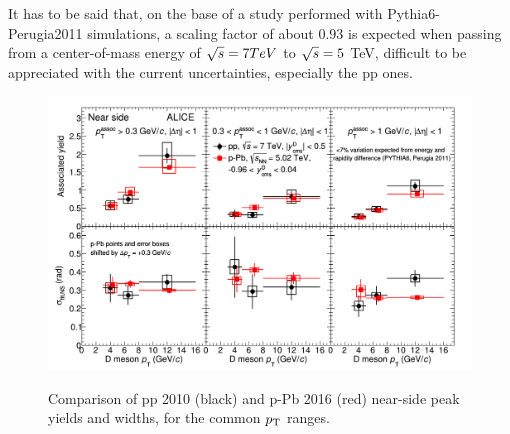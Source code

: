 It has to be said that, on the base of a study performed with Pythia6-Perugia2011 simulations, a scaling factor of about 0.93 is expected when passing from a center-of-mass energy of $\sqrt{s} = 7 TeV$ to $\sqrt{s} = 5$ TeV, difficult to be appreciated with the current uncertainties, especially the pp ones.

\begin{figure}[!htbp]
\centering
{\includegraphics[width=\linewidth]{figures/CfrPPandModels/ComparePPtoPPbFitResults.png}}
\caption{Comparison of pp 2010 (black) and p-Pb 2016 (red) near-side peak yields and widths, for the common $p_{\rm T}$ ranges.}
\label{fig:CfrppObs}
\end{figure}